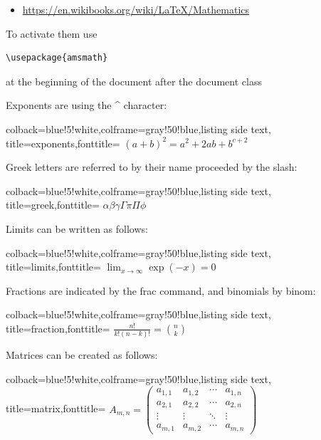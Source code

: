 \begin{itemize}

\item
  \url{https://en.wikibooks.org/wiki/LaTeX/Mathematics}
\end{itemize}

To activate them use 

\begin{verbatim}
\usepackage{amsmath}
\end{verbatim}

at the beginning of the document after the document class

Exponents are using the \^{} character:

\begin{tcblisting}{colback=blue!5!white,colframe=gray!50!blue,listing side text,
  title=exponents,fonttitle=\bfseries}
$(a+b)^2 = a^2 + 2ab + b^{c+2}$
\end{tcblisting} 

Greek letters are referred to by their name proceeded by the slash:

\begin{tcblisting}{colback=blue!5!white,colframe=gray!50!blue,listing side text,
  title=greek,fonttitle=\bfseries}
$ \alpha \beta \gamma \Gamma \pi \Pi \phi $
\end{tcblisting}


Limits can be written as follows:

\begin{tcblisting}{colback=blue!5!white,colframe=gray!50!blue,listing side text,  title=limits,fonttitle=\bfseries}
$ \lim_{x \to \infty} \exp(-x) = 0 $
\end{tcblisting}

Fractions are indicated by the frac command, and binomials by binom:

\begin{tcblisting}{colback=blue!5!white,colframe=gray!50!blue,listing side text,  title=fraction,fonttitle=\bfseries}
$ \frac{n!}{k!(n-k)!} = \binom{n}{k} $   
\end{tcblisting}

Matrices can be created as follows:

\begin{tcblisting}{colback=blue!5!white,colframe=gray!50!blue,listing side text,  title=matrix,fonttitle=\bfseries}
$ A_{m,n} = 
\begin{pmatrix}
  a_{1,1} & a_{1,2} & \cdots & a_{1,n} \\
  a_{2,1} & a_{2,2} & \cdots & a_{2,n} \\
  \vdots  & \vdots  & \ddots & \vdots  \\
  a_{m,1} & a_{m,2} & \cdots & a_{m,n} 
\end{pmatrix} $
\end{tcblisting}



